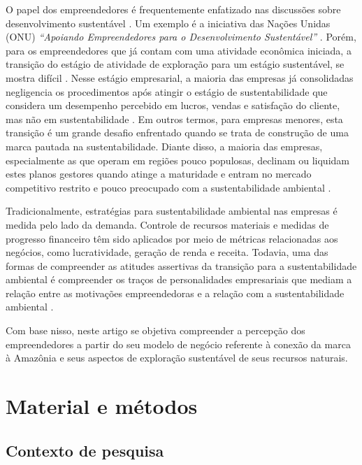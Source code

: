 O papel dos empreendedores é frequentemente enfatizado nas discussões sobre desenvolvimento sustentável \cite{Larsson2016TheSystem}. Um exemplo é a iniciativa das Nações Unidas (ONU) \textit{“Apoiando Empreendedores para o Desenvolvimento Sustentável”} \cite{SEED2015TurningEntrepreneurship}. Porém, para os empreendedores que já contam com uma atividade econômica iniciada, a transição do estágio de atividade de exploração para um estágio sustentável, se mostra difícil \cite{Imran2019ResourceCommitment}. Nesse estágio empresarial, a maioria das empresas já consolidadas negligencia os procedimentos após atingir o estágio de sustentabilidade que considera um desempenho percebido em lucros, vendas e satisfação do cliente, mas não em sustentabilidade \cite{Ismail2022EntrepreneursInnovations}. Em outros termos, para empresas menores, esta transição é um grande desafio enfrentado quando se trata de construção de uma marca pautada na sustentabilidade. Diante disso, a maioria das empresas, especialmente as que operam em regiões pouco populosas, declinam ou liquidam estes planos gestores quando atinge a maturidade e entram no mercado competitivo restrito e pouco preocupado com a sustentabilidade ambiental \cite{GalanMashenene2020PerformanceView}. 

Tradicionalmente, estratégias para sustentabilidade ambiental nas empresas é medida pelo lado da demanda. Controle de recursos materiais e medidas de progresso financeiro têm sido aplicados por meio de métricas relacionadas aos negócios, como lucratividade, geração de renda e receita. Todavia, uma das formas de compreender as atitudes assertivas da transição para a sustentabilidade ambiental é compreender os traços de personalidades empresariais que mediam a relação entre as motivações empreendedoras e a relação com a sustentabilidade ambiental \cite{Ismail2022EntrepreneursInnovations}.


Com base nisso, neste artigo se objetiva compreender a percepção dos empreendedores a partir do seu modelo de negócio referente à conexão da marca à Amazônia e seus aspectos de exploração sustentável de seus recursos naturais. 

\section{Material e métodos}

\subsection{Contexto de pesquisa}


